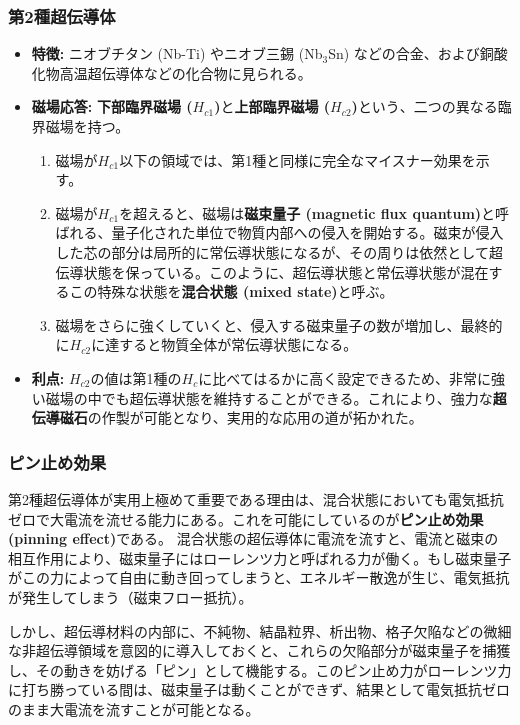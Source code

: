 \documentclass[11pt,a4paper]{ltjsarticle}
\begin{document}
\subsubsection*{第2種超伝導体}

\begin{itemize}
\item \textbf{特徴:} ニオブチタン (Nb-Ti) やニオブ三錫 (Nb$_3$Sn) などの合金、および銅酸化物高温超伝導体などの化合物に見られる。
\item \textbf{磁場応答:} \textbf{下部臨界磁場 ($H_{c1}$)}と\textbf{上部臨界磁場 ($H_{c2}$)}という、二つの異なる臨界磁場を持つ。
\begin{enumerate}
\item 磁場が$H_{c1}$以下の領域では、第1種と同様に完全なマイスナー効果を示す。
\item 磁場が$H_{c1}$を超えると、磁場は\textbf{磁束量子 (magnetic flux quantum)}と呼ばれる、量子化された単位で物質内部への侵入を開始する。磁束が侵入した芯の部分は局所的に常伝導状態になるが、その周りは依然として超伝導状態を保っている。このように、超伝導状態と常伝導状態が混在するこの特殊な状態を\textbf{混合状態 (mixed state)}と呼ぶ。
\item 磁場をさらに強くしていくと、侵入する磁束量子の数が増加し、最終的に$H_{c2}$に達すると物質全体が常伝導状態になる。
\end{enumerate}
\item \textbf{利点:} $H_{c2}$の値は第1種の$H_c$に比べてはるかに高く設定できるため、非常に強い磁場の中でも超伝導状態を維持することができる。これにより、強力な\textbf{超伝導磁石}の作製が可能となり、実用的な応用の道が拓かれた。
\end{itemize}

\subsubsection*{ピン止め効果}

第2種超伝導体が実用上極めて重要である理由は、混合状態においても電気抵抗ゼロで大電流を流せる能力にある。これを可能にしているのが\textbf{ピン止め効果 (pinning effect)}である。
混合状態の超伝導体に電流を流すと、電流と磁束の相互作用により、磁束量子にはローレンツ力と呼ばれる力が働く。もし磁束量子がこの力によって自由に動き回ってしまうと、エネルギー散逸が生じ、電気抵抗が発生してしまう（磁束フロー抵抗）。

しかし、超伝導材料の内部に、不純物、結晶粒界、析出物、格子欠陥などの微細な非超伝導領域を意図的に導入しておくと、これらの欠陥部分が磁束量子を捕獲し、その動きを妨げる「ピン」として機能する。このピン止め力がローレンツ力に打ち勝っている間は、磁束量子は動くことができず、結果として電気抵抗ゼロのまま大電流を流すことが可能となる。
\end{document}
